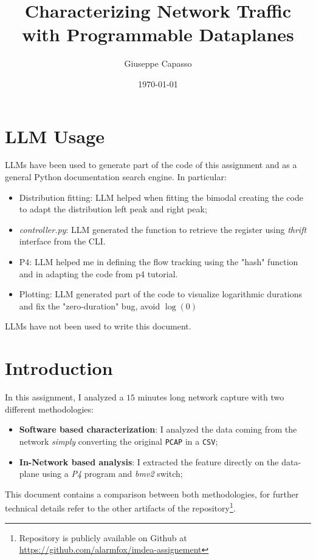 \documentclass[11pt,a4paper]{article}
\title{Characterizing Network Traffic with Programmable Dataplanes}
\author{Giuseppe Capasso}
\date{\today}
\begin{document}
\maketitle

\section*{LLM Usage}
LLMs have been used to generate part of the code of this assignment and as a general Python documentation
search engine. In particular:

\begin{itemize}
    \item Distribution fitting: LLM helped when fitting the bimodal creating the code to adapt the distribution left peak and right peak;
    \item \textit{controller.py}: LLM generated the function to retrieve the register using \textit{thrift}
        interface from the CLI.
    \item P4: LLM helped me in defining the flow tracking using the "hash" function and in adapting the code from p4 tutorial.
    \item Plotting: LLM generated part of the code to visualize logarithmic durations and fix the "zero-duration" bug, avoid $\log(0)$
\end{itemize}

LLMs have not been used to write this document.

\section{Introduction}
In this assignment, I analyzed a $15$ minutes long network capture with two different methodologies:

\begin{itemize}
    \item \textbf{Software based characterization}: I analyzed the data coming from the network \textit{simply} converting the original \texttt{PCAP} in a \texttt{CSV};
    \item \textbf{In-Network based analysis}: I extracted the feature directly on the data-plane using a \textit{P4} program and \textit{bmv2} switch;
\end{itemize}

This document contains a comparison between both methodologies, for further technical details refer to the other artifacts of the repository\footnote{Repository is publicly available on Github at \url{https://github.com/alarmfox/imdea-assignement}}.
\end{document}
